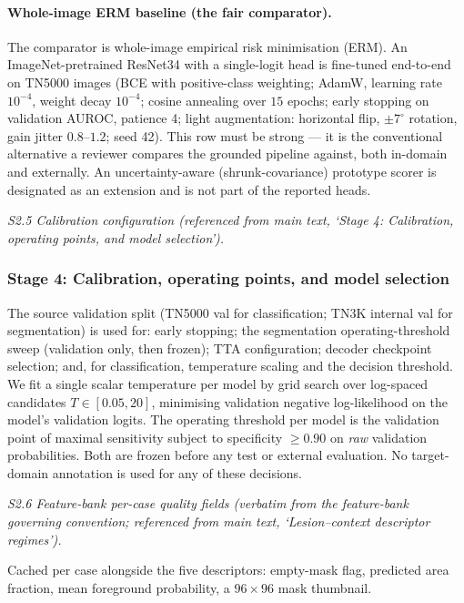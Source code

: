 \documentclass[11pt]{article}
\begin{document}
\paragraph{Whole-image ERM baseline (the fair comparator).}
The comparator is whole-image empirical risk minimisation (ERM). An
ImageNet-pretrained ResNet34 with a single-logit head is fine-tuned
end-to-end on TN5000 images (BCE with positive-class weighting; AdamW,
learning rate $10^{-4}$, weight decay $10^{-4}$; cosine annealing over
$15$ epochs; early stopping on validation AUROC, patience 4; light
augmentation: horizontal flip, $\pm7^{\circ}$ rotation, gain jitter
$0.8$--$1.2$; seed 42). This row must be strong --- it is the conventional
alternative a reviewer compares the grounded pipeline against, both
in-domain and externally. An uncertainty-aware (shrunk-covariance)
prototype scorer is designated as an extension and is not part of the
reported heads.


\noindent\emph{S2.5 Calibration configuration (referenced from main text, `Stage 4: Calibration, operating points, and model selection').}

\subsubsection{Stage 4: Calibration, operating points, and model selection}

The source validation split (TN5000 val for classification; TN3K internal
val for segmentation) is used for: early stopping; the segmentation
operating-threshold sweep (validation only, then frozen); TTA
configuration; decoder checkpoint selection; and, for classification,
temperature scaling and the decision threshold. We fit a single scalar temperature
per model by grid search over log-spaced candidates
$T\in[0.05, 20]$, minimising validation negative log-likelihood on the
model's validation logits. The operating threshold per model is the
validation point of maximal sensitivity subject to specificity
$\geq 0.90$ on \emph{raw} validation probabilities. Both are frozen before
any test or external evaluation. No target-domain annotation is used for
any of these decisions.


\noindent\emph{S2.6 Feature-bank per-case quality fields (verbatim from the feature-bank governing convention; referenced from main text, `Lesion--context descriptor regimes').}

Cached per case alongside the five descriptors: empty-mask flag, predicted area fraction, mean foreground probability, a $96\times96$ mask thumbnail.
\end{document}

